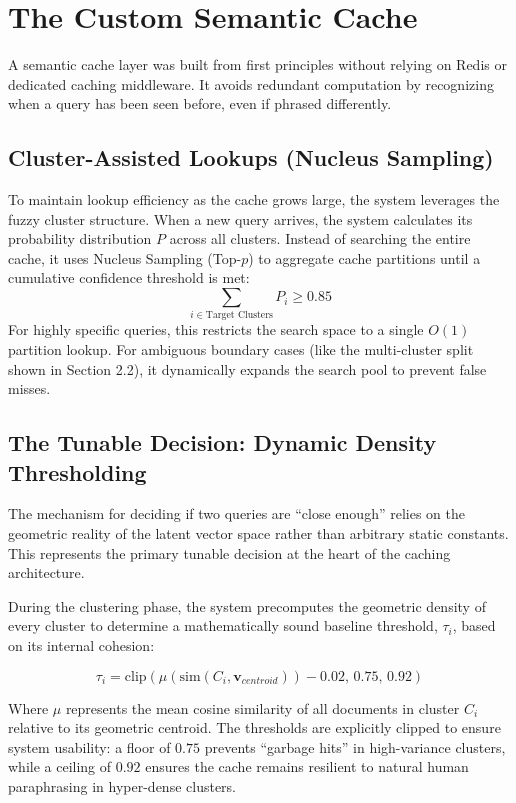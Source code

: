 \documentclass[11pt,a4paper]{article}
\begin{document}
\section{The Custom Semantic Cache}
A semantic cache layer was built from first principles without relying on Redis or dedicated caching middleware. It avoids redundant computation by recognizing when a query has been seen before, even if phrased differently.

\subsection{Cluster-Assisted Lookups (Nucleus Sampling)}
To maintain lookup efficiency as the cache grows large, the system leverages the fuzzy cluster structure. When a new query arrives, the system calculates its probability distribution $P$ across all clusters. Instead of searching the entire cache, it uses Nucleus Sampling (Top-$p$) to aggregate cache partitions until a cumulative confidence threshold is met:
\begin{equation}
    \sum_{i \in \text{Target Clusters}} P_i \ge 0.85
\end{equation}
For highly specific queries, this restricts the search space to a single $O(1)$ partition lookup. For ambiguous boundary cases (like the multi-cluster split shown in Section 2.2), it dynamically expands the search pool to prevent false misses.

\subsection{The Tunable Decision: Dynamic Density Thresholding}
The mechanism for deciding if two queries are ``close enough'' relies on the geometric reality of the latent vector space rather than arbitrary static constants. This represents the primary tunable decision at the heart of the caching architecture.

During the clustering phase, the system precomputes the geometric density of every cluster to determine a mathematically sound baseline threshold, $\tau_i$, based on its internal cohesion:

\begin{equation}
    \tau_i = \text{clip}\left(\mu(\text{sim}(C_i, \mathbf{v}_{centroid})) - 0.02, \, 0.75, \, 0.92\right)
\end{equation}

Where $\mu$ represents the mean cosine similarity of all documents in cluster $C_i$ relative to its geometric centroid. The thresholds are explicitly clipped to ensure system usability: a floor of $0.75$ prevents ``garbage hits'' in high-variance clusters, while a ceiling of $0.92$ ensures the cache remains resilient to natural human paraphrasing in hyper-dense clusters.
\end{document}
